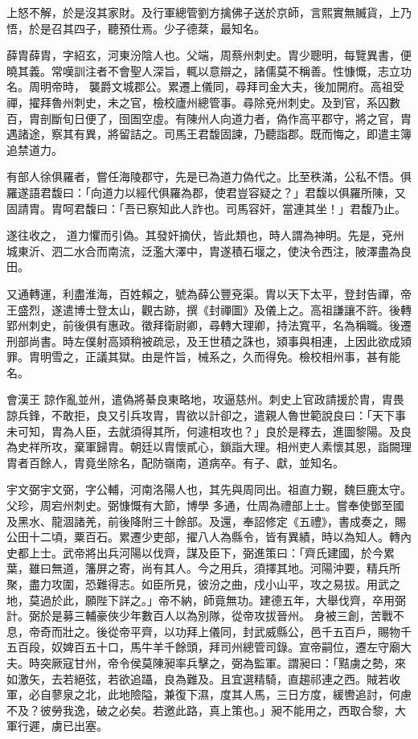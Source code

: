 \begin{pinyinscope}
 上怒不解，於是沒其家財。及行軍總管劉方擒佛子送於京師，言熙實無贓貨，上乃悟，於是召其四子，聽預仕焉。少子德棻，最知名。



 薛胄薛胄，字紹玄，河東汾陰人也。父端，周蔡州刺史。胄少聰明，每覽異書，便曉其義。常嘆訓注者不會聖人深旨，輒以意辯之，諸儒莫不稱善。性慷慨，志立功名。周明帝時，
 襲爵文城郡公。累遷上儀同，尋拜司金大夫，後加開府。高祖受禪，擢拜魯州刺史，未之官，檢校廬州總管事。尋除兗州刺史。及到官，系囚數百，胄剖斷旬日便了，囹圄空虛。有陳州人向道力者，偽作高平郡守，將之官，胄遇諸途，察其有異，將留詰之。司馬王君馥固諫，乃聽詣郡。既而悔之，即遣主簿追禁道力。



 有部人徐俱羅者，嘗任海陵郡守，先是已為道力偽代之。比至秩滿，公私不悟。俱羅遂語君馥曰：「向道力以經代俱羅為郡，使君豈容疑之？」君馥以俱羅所陳，又固請胄。胄呵君馥曰：「吾已察知此人詐也。司馬容奸，當連其坐！」君馥乃止。



 遂往收之，
 道力懼而引偽。其發奸摘伏，皆此類也，時人謂為神明。先是，兗州城東沂、泗二水合而南流，泛濫大澤中，胄遂積石堰之，使決令西注，陂澤盡為良田。



 又通轉運，利盡淮海，百姓賴之，號為薛公豐兗渠。胄以天下太平，登封告禪，帝王盛烈，遂遣博士登太山，觀古跡，撰《封禪圖》及儀上之。高祖謙讓不許。後轉郢州刺史，前後俱有惠政。徵拜衛尉卿，尋轉大理卿，持法寬平，名為稱職。後遷刑部尚書。時左僕射高熲稍被疏忌，及王世積之誅也，熲事與相連，上因此欲成熲罪。胄明雪之，正議其獄。由是忤旨，械系之，久而得免。檢校相州事，甚有能名。



 會漢王
 諒作亂並州，遣偽將綦良東略地，攻逼慈州。刺史上官政請援於胄，胄畏諒兵鋒，不敢拒，良又引兵攻胄，胄欲以計卻之，遣親人魯世範說良曰：「天下事未可知，胄為人臣，去就須得其所，何遽相攻也？」良於是釋去，進圖黎陽。及良為史祥所攻，棄軍歸胄。朝廷以胄懷貳心，鎖詣大理。相州吏人素懷其恩，詣闕理胄者百餘人，胄竟坐除名，配防嶺南，道病卒。有子、獻，並知名。



 宇文弼宇文弼，字公輔，河南洛陽人也，其先與周同出。祖直力覲，魏巨鹿太守。父珍，周宕州刺史。弼慷慨有大節，博學
 多通，仕周為禮部上士。嘗奉使鄧至國及黑水、龍涸諸羌，前後降附三十餘部。及還，奉詔修定《五禮》，書成奏之，賜公田十二頃，粟百石。累遷少吏部，擢八人為縣令，皆有異績，時以為知人。轉內史都上士。武帝將出兵河陽以伐齊，謀及臣下，弼進策曰：「齊氏建國，於今累葉，雖曰無道，籓屏之寄，尚有其人。今之用兵，須擇其地。河陽沖要，精兵所聚，盡力攻圍，恐難得志。如臣所見，彼汾之曲，戍小山平，攻之易拔。用武之地，莫過於此，願陛下詳之。」帝不納，師竟無功。建德五年，大舉伐齊，卒用弼計。弼於是募三輔豪俠少年數百人以為別隊，從帝攻拔晉州。
 身被三創，苦戰不息，帝奇而壯之。後從帝平齊，以功拜上儀同，封武威縣公，邑千五百戶，賜物千五百段，奴婢百五十口，馬牛羊千餘頭，拜司州總管司錄。宣帝嗣位，遷左守廟大夫。時突厥寇甘州，帝令侯莫陳昶率兵擊之，弼為監軍。謂昶曰：「黠虜之勢，來如激矢，去若絕弦，若欲追躡，良為難及。且宜選精騎，直趨祁連之西。賊若收軍，必自蓼泉之北，此地險隘，兼復下濕，度其人馬，三日方度，緩轡追討，何慮不及？彼勞我逸，破之必矣。若邀此路，真上策也。」昶不能用之，西取合黎，大軍行遲，虜已出塞。




\end{pinyinscope}
